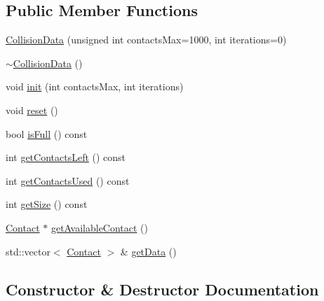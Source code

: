 \subsection*{Public Member Functions}
\begin{DoxyCompactItemize}
\item 
\mbox{\hyperlink{classr3_1_1_collision_data_a439100db9ec5b734e2f0b778d2f97cce}{Collision\+Data}} (unsigned int contacts\+Max=1000, int iterations=0)
\item 
\mbox{\hyperlink{classr3_1_1_collision_data_a3fd93aed7add6b43bc6b3dca59d638f2}{$\sim$\+Collision\+Data}} ()
\item 
void \mbox{\hyperlink{classr3_1_1_collision_data_a2af69fd6da492254b1a134d4ef82efce}{init}} (int contacts\+Max, int iterations)
\item 
void \mbox{\hyperlink{classr3_1_1_collision_data_af74822ca6881f5ab54447a73ac26d7fd}{reset}} ()
\item 
bool \mbox{\hyperlink{classr3_1_1_collision_data_aebb099e77b79235942a9c0166eb66a78}{is\+Full}} () const
\item 
int \mbox{\hyperlink{classr3_1_1_collision_data_a13e8ade4bbbbc63a1437de9371fea879}{get\+Contacts\+Left}} () const
\item 
int \mbox{\hyperlink{classr3_1_1_collision_data_aaf0e65914133cd35cc32224df851561e}{get\+Contacts\+Used}} () const
\item 
int \mbox{\hyperlink{classr3_1_1_collision_data_ad0898e21e34b4558dbdd68dd115c49d8}{get\+Size}} () const
\item 
\mbox{\hyperlink{classr3_1_1_contact}{Contact}} $\ast$ \mbox{\hyperlink{classr3_1_1_collision_data_ad0e0b85004905b48a8faf7be34bdf305}{get\+Available\+Contact}} ()
\item 
std\+::vector$<$ \mbox{\hyperlink{classr3_1_1_contact}{Contact}} $>$ \& \mbox{\hyperlink{classr3_1_1_collision_data_acb1bb23e8d0f37f0ebc39e8f7642419f}{get\+Data}} ()
\end{DoxyCompactItemize}


\subsection{Constructor \& Destructor Documentation}
\mbox{\label{classr3_1_1_collision_data_a439100db9ec5b734e2f0b778d2f97cce}} 
